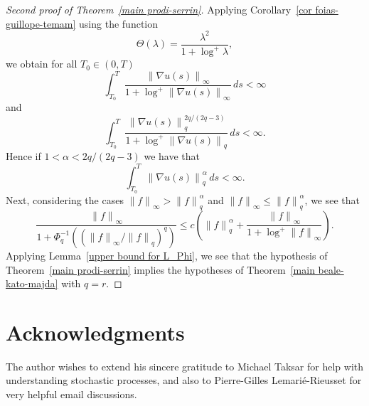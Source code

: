 \documentclass[12pt]{amsart}
\theoremstyle{remark}
\newcommand{\snormo}[1]{{\mathopen\|#1\mathclose\|}}
\begin{document}
\begin{proof}[Second proof of Theorem~\ref{main prodi-serrin}]
Applying Corollary~\ref{cor foias-guillope-temam} using the function
$$ \Theta(\lambda) = \frac{\lambda^2}{1+\log^+\lambda} ,$$
we obtain for all $T_0 \in (0,T)$
$$ \int_{T_0}^T \frac{\snormo{\nabla u(s)}_\infty}
   {1+\log^+\snormo{\nabla u(s)}_\infty} \, ds < \infty $$
and
$$ \int_{T_0}^T \frac{\snormo{\nabla u(s)}_q^{2q/(2q-3)}}
   {1+\log^+\snormo{\nabla u(s)}_q} \, ds < \infty .$$
Hence if $1<\alpha<2q/(2q-3)$ we have that
$$ \int_{T_0}^T \snormo{\nabla u(s)}_q^\alpha \, ds < \infty .$$
Next, considering the cases 
$\snormo{f}_\infty > \snormo{f}_q^\alpha$
and
$\snormo{f}_\infty \le \snormo{f}_q^\alpha$,
we see that
$$ \frac{\snormo f_\infty}{1+\Phi_q^{-1}(({\snormo f_\infty}/{\snormo f_q})^q)}
   \le c \left( 
   \snormo{f}_q^\alpha +
   \frac{\snormo{f}_\infty}
   {1+\log^+\snormo{f}_\infty} \right) .$$
Applying Lemma~\ref{upper bound for L_Phi}, we see
that the hypothesis of Theorem~\ref{main prodi-serrin} implies the
hypotheses of Theorem~\ref{main beale-kato-majda} with $q=r$.
\end{proof}

\section*{Acknowledgments}

The author wishes to extend his sincere gratitude to Michael Taksar for
help with understanding stochastic processes, and also to Pierre-Gilles
Lemari\'e-Rieusset for very helpful email discussions.
\end{document}
